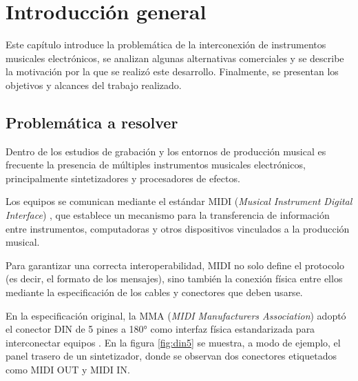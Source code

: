 
\chapter{Introducción general} %

\label{Chapter1} %
\label{IntroGeneral}

Este capítulo introduce la problemática de la interconexión de instrumentos musicales electrónicos, se analizan algunas alternativas comerciales y se describe la motivación por la que se realizó este desarrollo. Finalmente, se presentan los objetivos y alcances del trabajo realizado.



\newcommand{\keyword}[1]{\textbf{#1}}
\newcommand{\tabhead}[1]{\textbf{#1}}
\newcommand{\code}[1]{\texttt{#1}}
\newcommand{\file}[1]{\texttt{\bfseries#1}}
\newcommand{\option}[1]{\texttt{\itshape#1}}
\newcommand{\grados}{$^{\circ}$}


\section{Problemática a resolver} \label{problematica}

Dentro de los estudios de grabación y los entornos de producción musical es frecuente la presencia de múltiples instrumentos musicales electrónicos, principalmente sintetizadores y procesadores de efectos.

Los equipos se comunican mediante el estándar MIDI (\textit{Musical Instrument Digital Interface}) \cite{mma:midi_spec}, que establece un mecanismo para la transferencia de información entre instrumentos, computadoras y otros dispositivos vinculados a la producción musical.

Para garantizar una correcta interoperabilidad, MIDI no solo define el protocolo (es decir, el formato de los mensajes), sino también la conexión física entre ellos mediante la especificación de los cables y conectores que deben usarse.

En la especificación original, la MMA (\textit{MIDI Manufacturers Association}) adoptó el conector DIN de 5 pines a 180° como interfaz física estandarizada para interconectar equipos \cite{mma:midi_spec}. En la figura \ref{fig:din5} se muestra, a modo de ejemplo, el panel trasero de un sintetizador, donde se observan dos conectores etiquetados como MIDI OUT y MIDI IN.

